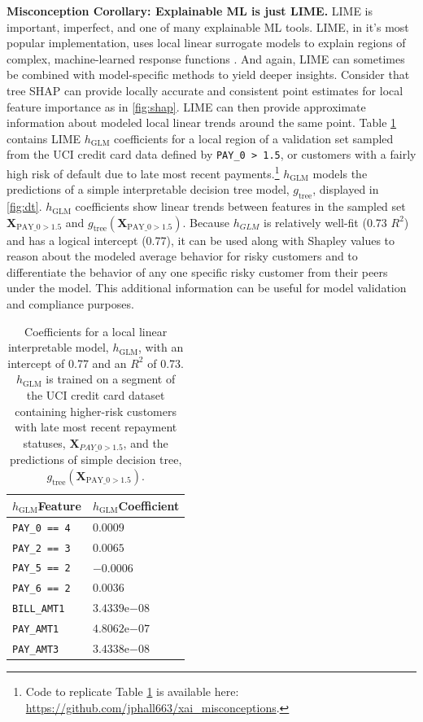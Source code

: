 \documentclass[fleqn]{article}
\begin{document}
\noindent\textbf{Misconception Corollary: Explainable ML is just LIME.} LIME is important, imperfect, and one of many explainable ML tools. LIME, in it's most popular implementation, uses local linear surrogate models to explain regions of complex, machine-learned response functions \cite{lime}. And again, LIME can sometimes be combined with model-specific methods to yield deeper insights. Consider that tree SHAP can provide locally accurate and consistent point estimates for local feature importance as in \ref{fig:shap}. LIME can then provide approximate information about modeled local linear trends around the same point. Table \ref{tab:lime} contains LIME $h_{\text{GLM}}$ coefficients for a local region of a validation set sampled from the UCI credit card data defined by \texttt{PAY\_0 > 1.5}, or customers with a fairly high risk of default due to late most recent payments.\footnote{Code to replicate Table \ref{tab:lime} is available here: \url{https://github.com/jphall663/xai_misconceptions}.} $h_{\text{GLM}}$ models the predictions of a simple interpretable decision tree model, $g_{\text{tree}}$, displayed in \ref{fig:dt}. $h_{\text{GLM}}$ coefficients show linear trends between features in the sampled set $\mathbf{X}_{\text{PAY\_0} > 1.5}$ and $g_{\text{tree}}(\mathbf{X}_{\text{PAY\_0}> 1.5})$. Because $h_{GLM}$ is relatively well-fit (0.73 $R^2$) and has a logical intercept (0.77), it can be used along with Shapley values to reason about the modeled average behavior for risky customers and to differentiate the behavior of any one specific risky customer from their peers under the model. This additional information can be useful for model validation and compliance purposes.

\begin{table}[htb!]
	\caption{Coefficients for a local linear interpretable model, $h_{\text{GLM}}$, with an intercept of 0.77 and an $R^2$ of 0.73. $h_{\text{GLM}}$ is trained on a segment of the UCI credit card dataset containing higher-risk customers with late most recent repayment statuses, $\mathbf{X}_{PAY \_ 0 > 1.5}$, and the predictions of simple decision tree, $g_{\text{tree}}(\mathbf{X}_{\text{PAY\_0} > 1.5})$.}
		\centering
				\begin{tabular}{ | p{2cm} | p{1.7cm} | }
				\hline
				$h_{\text{GLM}}$\newline Feature & $h_{\text{GLM}}$\newline Coefficient \\ 
				\hline
				\texttt{PAY\_0 == 4} & $0.0009$ \\
				\hline
				\texttt{PAY\_2 == 3} & $0.0065$ \\
				\hline
				\texttt{PAY\_5 == 2} & $-0.0006$ \\
				\hline
				\texttt{PAY\_6 == 2} & $0.0036$ \\
				\hline				
				\texttt{BILL\_AMT1} & $3.4339\mathrm{e}{-08}$ \\
				\hline
				\texttt{PAY\_AMT1} & $4.8062\mathrm{e}{-07}$ \\
				\hline	
				\texttt{PAY\_AMT3} & $3.4338\mathrm{e}{-08}$ \\	
				\hline	
			\end{tabular}	
  		\label{tab:lime}
\end{table}	
\end{document}
